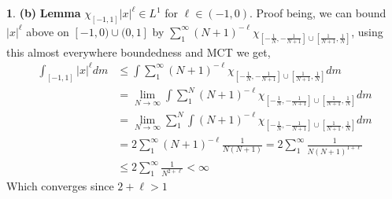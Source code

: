 \documentclass[10.5pt]{article}
\theoremstyle{definition}
\newtheorem{pb}{}
\newcommand{\abs}[1]{\left\vert#1\right\vert}
\begin{document}
\begin{pb}
        \textbf{(b)}
        \textbf{Lemma} \(\chi_{[-1,1]}\abs{x}^\ell \in L^1\) for \(\ell \in (-1,0)\). Proof being, we can bound \(\abs{x}^\ell\) above on \([-1,0)\cup(0,1]\) by \(\sum_1^{\infty} (N+1)^{-\ell}\chi_{[-\frac{1}{N},-\frac{1}{N+1}]\cup[\frac{1}{N+1},\frac{1}{N}]}\), using this almost everywhere boundedness and MCT we get,
        \begin{align*}
            \int_{[-1,1]} \abs{x}^\ell dm &\leq \int \sum_1^\infty (N+1)^{-\ell}\chi_{[-\frac{1}{N},-\frac{1}{N+1}]\cup[\frac{1}{N+1},\frac{1}{N}]}dm \\
            &= \lim_{N\to\infty}\int\sum_1^N (N+1)^{-\ell}\chi_{[-\frac{1}{N},-\frac{1}{N+1}]\cup[\frac{1}{N+1},\frac{1}{N}]}dm \\
            &= \lim_{N\to\infty}\sum_1^N \int (N+1)^{-\ell}\chi_{[-\frac{1}{N},-\frac{1}{N+1}]\cup[\frac{1}{N+1},\frac{1}{N}]}dm \\
            &= 2\sum_1^\infty (N+1)^{-\ell} \frac{1}{N(N+1)} = 2\sum_1^\infty \frac{1}{N(N+1)^{1+\ell}} \\
            &\leq 2\sum_1^\infty \frac{1}{N^{2+\ell}} < \infty
        \end{align*}
        Which converges since \(2 + \ell > 1\)
        

\end{pb}
\end{document}
